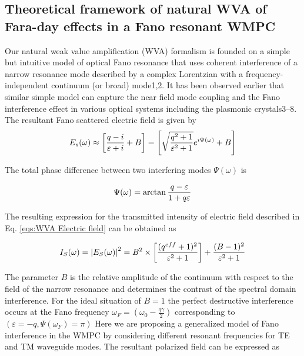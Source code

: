\documentclass[13pt]{article}
\begin{document}
\subsection{ Theoretical framework of natural WVA of Fara-day effects in a Fano resonant WMPC}
\noindent
\par
	Our natural weak value amplification (WVA) formalism is founded on a simple but intuitive model of optical Fano resonance that uses coherent interference of a narrow resonance mode described by a complex Lorentzian with a frequency-independent continuum (or broad) mode1,2. It has been  observed earlier that similar simple model can capture the near field mode coupling and the Fano interference  effect  in  various  optical  systems including  the  plasmonic  crystals3–8.  The  resultant Fano scattered electric field is given by
\begin{equation}
	\centering
	E_s(\omega) \approx \left[ \frac{q - i}{\varepsilon + i} +B \right] = \left[ \sqrt{\frac{q^2 +1}{\varepsilon^2 +1}} e^{i\Psi(\omega)} +B\right]
	\label{eqs:WVA Electric field}
\end{equation}

	The total phase difference between two interfering modes $\Psi(\omega)$ is

\begin{equation}
	\centering
	\Psi(\omega) = \arctan{\frac{q - \varepsilon}{1 + q\varepsilon}}
	\label{eqs:WVA Electric field phase}
\end{equation}

	The resulting expression for the transmitted intensity of electric field described in Eq. \ref{eqs:WVA Electric field} can be  obtained as 

\begin{equation}
	\centering
	I_S(\omega) = \abs{E_S(\omega)}^2 = B^2 \times \left[ \frac{(q^{eff} + 1)^2}{\varepsilon^2 + 1} \right] + \frac{(B - 1)^2}{\varepsilon^2 + 1}
	\label{eqs:WVA Eletric intensity}
\end{equation}

The parameter $B$ is the relative amplitude of the continuum with respect to the field of the narrow resonance and determines the contrast of the spectral domain interference. For the ideal situation of $B = 1$ the  perfect  destructive  interference  occurs  at  the  Fano  frequency $\omega_F = \left( \omega_0 - \frac{q\gamma}{2} \right)$ corresponding to $(\varepsilon = -q, \Psi(\omega_F) = \pi)$
Here  we  are  proposing  a  generalized  model  of  Fano  interference  in  the  WMPC  by  considering different resonant frequencies for TE and TM waveguide modes. The resultant polarized field can be expressed as
\end{document}
